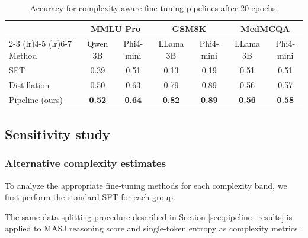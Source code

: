 \begin{table}[ht]
\centering
\begin{tabular}{l cc cc cc}
\toprule
& \multicolumn{2}{c}{MMLU Pro} & \multicolumn{2}{c}{GSM8K} & \multicolumn{2}{c}{MedMCQA} \\
\cmidrule(lr){2-3} \cmidrule(lr){4-5} \cmidrule(lr){6-7}
Method & Qwen 3B & Phi4-mini & LLama 3B & Phi4-mini & LLama 3B & Phi4-mini \\
\midrule
SFT & 0.39 & 0.51 & 0.13 & 0.19 & 0.51 & 0.51 \\
Distillation & \underline{0.50} & \underline{0.63} & \underline{0.79} & \underline{0.89} & \underline{0.56} & \underline{0.57} \\
Pipeline (ours) & \textbf{0.52} & \textbf{0.64} & \textbf{0.82} & \textbf{0.89} & \textbf{0.56} & \textbf{0.58} \\
\bottomrule
\end{tabular}
\caption{Accuracy for complexity-aware fine-tuning pipelines after 20 epochs.}
\label{tab:results_20epochs}
\end{table}

\subsection{Sensitivity study}
\label{sec:sensitivity_study}

\subsubsection{Alternative complexity estimates}

To analyze the appropriate fine-tuning methods for each complexity band, we first perform the standard SFT for each group.

The same data-splitting procedure described in Section \ref{sec:pipeline_results} is applied to MASJ reasoning score and single-token entropy as complexity metrics.

